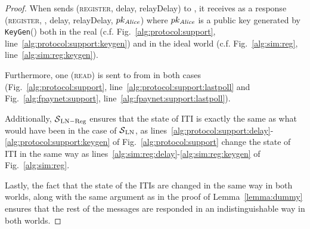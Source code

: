 \begin{proof}
  When \environment{} sends (\textsc{register}, delay, relayDelay) to \alice{},
  it receives as a response (\textsc{register}, \alice, delay, relayDelay,
  $pk_{\mathit{Alice}}$) where $pk_{\mathit{Alice}}$ is a public key generated by
  \texttt{KeyGen}() both in the real (c.f. Fig.~\ref{alg:protocol:support},
  line~\ref{alg:protocol:support:keygen}) and in the ideal world (c.f.
  Fig.~\ref{alg:sim:reg}, line~\ref{alg:sim:reg:keygen}).

  Furthermore, one (\textsc{read}) is sent to \ledger{} from \alice{} in both
  cases (Fig.~\ref{alg:protocol:support}, line~\ref{alg:protocol:support:lastpoll}
  and Fig.~\ref{alg:fpaynet:support}, line~\ref{alg:fpaynet:support:lastpoll}).

  Additionally, $\mathcal{S}{}_{\mathrm{LN - Reg}}$ ensures that the state of
  \alice{} ITI is exactly the same as what would have been in the case of
  $\mathcal{S}{}_{\mathrm{LN}}$, as
  lines~\ref{alg:protocol:support:delay}-\ref{alg:protocol:support:keygen} of
  Fig.~\ref{alg:protocol:support} change the state of \alice{} ITI in the same
  way as lines~\ref{alg:sim:reg:delay}-\ref{alg:sim:reg:keygen} of
  Fig.~\ref{alg:sim:reg}.

  Lastly, the fact that the state of the \alice{} ITIs are changed in the same
  way in both worlds, along with the same argument as in the proof of
  Lemma~\ref{lemma:dummy} ensures that the rest of the messages are responded in
  an indistinguishable way in both worlds.
\end{proof}
